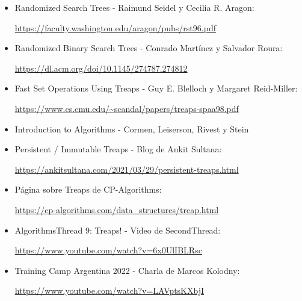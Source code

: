 \documentclass{article}
\begin{document}
\begin{itemize}
\item Randomized Search Trees - Raimund Seidel y Cecilia R. Aragon: 

\url{https://faculty.washington.edu/aragon/pubs/rst96.pdf}

\item Randomized Binary Search Trees - Conrado Martínez y Salvador Roura: 

\url{https://dl.acm.org/doi/10.1145/274787.274812}

\item Fast Set Operations Using Treaps - Guy E. Blelloch y Margaret Reid-Miller: 

\url{https://www.cs.cmu.edu/~scandal/papers/treaps-spaa98.pdf}

\item Introduction to Algorithms - Cormen, Leiserson, Rivest y Stein

\item Persistent / Immutable Treaps - Blog de Ankit Sultana: 

\url{https://ankitsultana.com/2021/03/29/persistent-treaps.html}

\item Página sobre Treaps de CP-Algorithms: 

\url{https://cp-algorithms.com/data_structures/treap.html}

\item AlgorithmsThread 9: Treaps! - Video de SecondThread: 

\url{https://www.youtube.com/watch?v=6x0UlIBLRsc}

\item Training Camp Argentina 2022 - Charla de Marcos Kolodny: 

\url{https://www.youtube.com/watch?v=LAVptsKXbjI}
\end{itemize}
\end{document}
